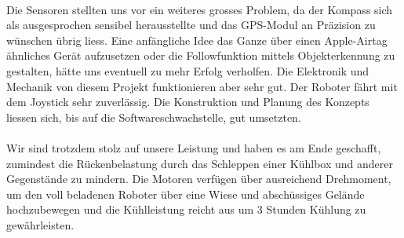 \\
Die Sensoren stellten uns vor ein weiteres grosses Problem, da der Kompass sich als ausgesprochen sensibel herausstellte und das GPS-Modul an Präzision zu wünschen übrig liess. Eine anfängliche Idee das Ganze über einen Apple-Airtag ähnliches Gerät aufzusetzen oder die Followfunktion mittels Objekterkennung zu gestalten, hätte uns eventuell zu mehr Erfolg verholfen.  Die Elektronik und Mechanik von diesem Projekt funktionieren aber sehr gut. Der Roboter fährt mit dem Joystick sehr zuverlässig. Die Konstruktion und Planung des Konzepts liessen sich, bis auf die Softwareschwachstelle, gut umsetzten.\\
\\
Wir sind trotzdem stolz auf unsere Leistung und haben es am Ende geschafft, zumindest die Rückenbelastung durch das Schleppen einer Kühlbox und anderer Gegenstände zu mindern. Die Motoren verfügen über ausreichend Drehmoment, um den voll beladenen Roboter über eine Wiese und abschüssiges Gelände hochzubewegen und die Kühlleistung reicht aus um 3 Stunden Kühlung zu gewährleisten.
